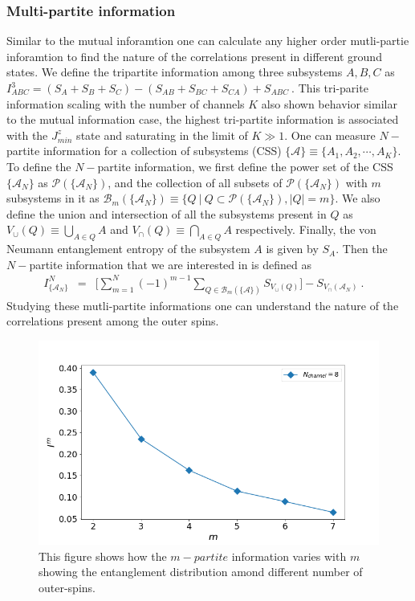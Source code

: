 \documentclass[reprint,prb,superscriptaddress]{revtex4-1}
\begin{document}
\subsubsection{Multi-partite information}
\noindent Similar to the mutual inforamtion one can calculate any higher order mutli-partie inforamtion to find the nature of the correlations present in different ground states. We define the tripartite information among three subsystems $A,B,C$ as $I^3_{ABC} = (S_A+S_B+S_C)-(S_{AB}+S_{BC}+S_{CA})+S_{ABC}~$. This tri-parite information scaling with the number of channels $K$ also shown behavior similar to the mutual information case, the highest tri-partite information is associated with the $J^z_{min}$ state and saturating in the limit of $K\gg 1$. One can measure $N-$partite information for a collection of subsystems (CSS) $\{\mathcal{A}\}\equiv\{A_1,A_2,\cdots,A_K\}$. To define the $N-$partite information, we first define the power set of the CSS $\{\mathcal{A}_N\}$ as $\mathcal{P}(\{\mathcal{A}_{N}\})$, and the collection of all subsets of $\mathcal{P}(\{\mathcal{A}_{N}\})$ with $m$ subsystems in it as $\mathcal{B}_m(\{\mathcal{A}_N\})\equiv \{ Q~| ~Q\subset \mathcal{P}(\{\mathcal{A}_{N}\}), |Q|=m \}$. We also define the union and intersection of all the subsystems present in $Q$ as ${V}_{\cup}({Q})\equiv \bigcup_{A\in Q} A$ and ${V}_{\cap}({Q})\equiv \bigcap_{A\in Q} A$ respectively. Finally, the von Neumann entanglement entropy of the subsystem $A$ is given by $S_{A} $. Then the $N-$partite information that we are interested in is defined as
\begin{eqnarray}
I^{N}_{\{\mathcal{A}_N\}} &=& \bigg[\displaystyle\sum_{m=1}^{N} (-1)^{m-1} \displaystyle\sum_{Q \in \mathcal{B}_m(\{\mathcal{A}\})} S_{V_{\cup}({Q})} \bigg]- S_{V_{\cap}(\mathcal{A}_N)}~.~~~~
\label{eq:I_N_definition}
\end{eqnarray}
Studying these mutli-partite informations one can understand the nature of the correlations present among the outer spins.
\begin{figure}
\includegraphics[scale=0.32]{plt/I_N_vs_N_N9.png}
\caption{This figure shows how the $m-partite$ information varies with $m$ showing the entanglement distribution amond different number of outer-spins.}
\label{fig:Im_vs_m}
\end{figure}
\end{document}
